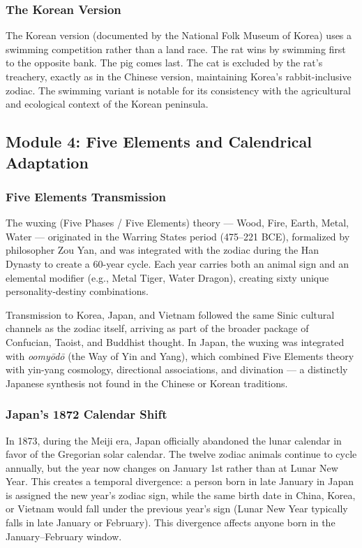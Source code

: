 \documentclass[11pt,letterpaper]{article}
\begin{document}
\subsubsection{The Korean Version}

The Korean version (documented by the National Folk Museum of Korea) uses a swimming competition rather than a land race. The rat wins by swimming first to the opposite bank. The pig comes last. The cat is excluded by the rat's treachery, exactly as in the Chinese version, maintaining Korea's rabbit-inclusive zodiac. The swimming variant is notable for its consistency with the agricultural and ecological context of the Korean peninsula.

\subsection{Module 4: Five Elements and Calendrical Adaptation}

\subsubsection{Five Elements Transmission}

The wuxing (Five Phases / Five Elements) theory --- Wood, Fire, Earth, Metal, Water --- originated in the Warring States period (475--221 BCE), formalized by philosopher Zou Yan, and was integrated with the zodiac during the Han Dynasty to create a 60-year cycle. Each year carries both an animal sign and an elemental modifier (e.g., Metal Tiger, Water Dragon), creating sixty unique personality-destiny combinations.

Transmission to Korea, Japan, and Vietnam followed the same Sinic cultural channels as the zodiac itself, arriving as part of the broader package of Confucian, Taoist, and Buddhist thought. In Japan, the wuxing was integrated with \textit{oomy\={o}d\={o}} (the Way of Yin and Yang), which combined Five Elements theory with yin-yang cosmology, directional associations, and divination --- a distinctly Japanese synthesis not found in the Chinese or Korean traditions.

\subsubsection{Japan's 1872 Calendar Shift}

In 1873, during the Meiji era, Japan officially abandoned the lunar calendar in favor of the Gregorian solar calendar. The twelve zodiac animals continue to cycle annually, but the year now changes on January 1st rather than at Lunar New Year. This creates a temporal divergence: a person born in late January in Japan is assigned the new year's zodiac sign, while the same birth date in China, Korea, or Vietnam would fall under the previous year's sign (Lunar New Year typically falls in late January or February). This divergence affects anyone born in the January--February window.
\end{document}
